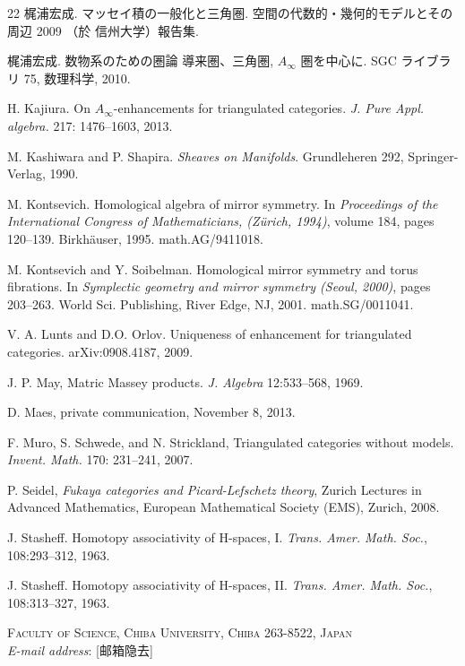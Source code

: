 \begin{thebibliography}{22}
 梶浦宏成. マッセイ積の一般化と三角圏.
空間の代数的{・}幾何的モデルとその周辺 2009 （於 信州大学）報告集.

 梶浦宏成. 数物系のための圏論\textendash{} 導来圏、三角圏,
\(A_{\infty}\) 圏を中心に. SGC ライブラリ 75, 数理科学, 2010.

 H. Kajiura. On \(A_{\infty}\)-enhancements for triangulated
categories. \emph{J. Pure Appl. algebra.} 217: 1476--1603, 2013.

 M. Kashiwara and P. Shapira. \emph{Sheaves on Manifolds}.
Grundleheren 292, Springer-Verlag, 1990.

 M. Kontsevich. Homological algebra of mirror symmetry. In
\emph{Proceedings of the International Congress of Mathematicians,
(Zürich, 1994)}, volume 184, pages 120--139. Birkhäuser, 1995.
math.AG/9411018.

 M. Kontsevich and Y. Soibelman. Homological mirror symmetry and
torus fibrations. In \emph{Symplectic geometry and mirror symmetry
(Seoul, 2000)}, pages 203--263. World Sci. Publishing, River Edge, NJ, 2001.
math.SG/0011041.

 V. A. Lunts and D.O. Orlov. Uniqueness of enhancement for
triangulated categories. arXiv:0908.4187, 2009.

 J. P. May, Matric Massey products. \emph{J. Algebra}
12:533--568, 1969.

 D. Maes, private communication, November 8, 2013.

 F. Muro, S. Schwede, and N. Strickland, Triangulated categories
without models. \emph{Invent. Math.} 170: 231--241, 2007.

 P. Seidel, \emph{Fukaya categories and Picard-Lefschetz theory},
Zurich Lectures in Advanced Mathematics, European Mathematical Society (EMS),
Zurich, 2008.

 J. Stasheff. Homotopy associativity of H-spaces, I.
\emph{Trans. Amer. Math. Soc.}, 108:293--312, 1963.

 J. Stasheff. Homotopy associativity of H-spaces, II.
\emph{Trans. Amer. Math. Soc.}, 108:313--327, 1963.

\end{thebibliography}

\vspace{2.5em}
\begin{center}
\textsc{Faculty of Science, Chiba University, Chiba 263-8522, Japan}\\[6pt]
\emph{E-mail address}: [邮箱隐去]
\end{center}
